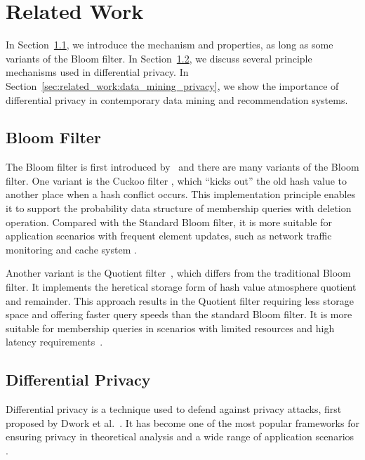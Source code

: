 \section{Related Work} \label{sec:related_work}

In Section~\ref{sec:related_word:bloom_filter}, we introduce the mechanism and properties, as long as some variants of the Bloom filter.
In Section~\ref{sec:related_work:dp}, we discuss several principle mechanisms used in differential privacy.
In Section~\ref{sec:related_work:data_mining_privacy}, we show the importance of differential privacy in contemporary data mining and recommendation systems. 

\subsection{Bloom Filter} \label{sec:related_word:bloom_filter}


The Bloom filter is first introduced by~\cite{b70} and 
there are many variants of the Bloom filter. One variant is the Cuckoo filter \cite{fakm14}, which ``kicks out'' the old hash value to another place when a hash conflict occurs. This implementation principle enables it to support the probability data structure of membership queries with deletion operation. Compared with the Standard Bloom filter, it is more suitable for application scenarios with frequent element updates, such as network traffic monitoring \cite{gjh18} and cache system \cite{wyqk22}.

Another variant is the Quotient filter~\cite{gfo18}, which differs from the traditional Bloom filter. It implements the heretical storage form of hash value atmosphere quotient and remainder. 
This approach results in the Quotient filter requiring less storage space and offering faster query speeds than the standard Bloom filter.
It is more suitable for membership queries in scenarios with limited resources and high latency requirements~\cite{pcd+21, aa16}.

\subsection{Differential Privacy} \label{sec:related_work:dp}

Differential privacy is a technique used to defend against privacy attacks, first proposed 
by Dwork et al.~\cite{dmns06}. It has become one of the most popular frameworks for ensuring privacy in theoretical analysis and a wide range of application scenarios 
\cite{llsy17, ygz+23,wcy+23,cxj24, sg24, gls+25, gll+24d,llsz24_nn_tw,lls+24_dp_je, gls+24d, fll24, syyz23, lhr+24, hll+24, ylh+24}. 


